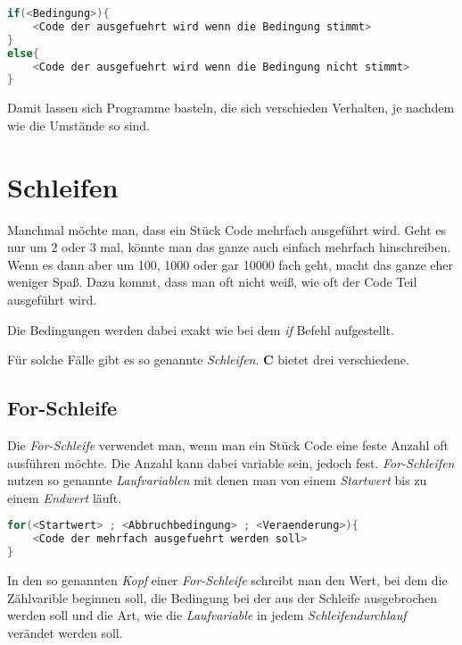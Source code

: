 \documentclass[c_worksheet.tex]{subfiles}
\begin{document}
\begin{lstlisting}[language=c]
if(<Bedingung>){
	<Code der ausgefuehrt wird wenn die Bedingung stimmt>
}
else{
	<Code der ausgefuehrt wird wenn die Bedingung nicht stimmt>
}
\end{lstlisting}

Damit lassen sich Programme basteln, die sich verschieden Verhalten, je nachdem wie die Umstände so sind.





\section{Schleifen} 

Manchmal möchte man, dass ein Stück Code mehrfach ausgeführt wird. Geht es nur um 2 oder 3 mal, könnte man das ganze auch einfach mehrfach hinschreiben. Wenn es dann aber um 100, 1000 oder gar 10000 fach geht, macht das ganze eher weniger Spaß. Dazu kommt, dass man oft nicht weiß, wie oft der Code Teil ausgeführt wird.

Die Bedingungen werden dabei exakt wie bei dem \emph{if} Befehl aufgestellt.

Für solche Fälle gibt es so genannte \emph{Schleifen}. \textbf{C} bietet drei verschiedene.

\subsection{For-Schleife}

Die \emph{For-Schleife} verwendet man, wenn man ein Stück Code eine feste Anzahl oft ausführen möchte. Die Anzahl kann dabei variable sein, jedoch fest. \emph{For-Schleifen} nutzen so genannte \emph{Laufvariablen} mit denen man von einem \emph{Startwert} bis zu einem \emph{Endwert} läuft.

\begin{lstlisting}[language=c]
for(<Startwert> ; <Abbruchbedingung> ; <Veraenderung>){
	<Code der mehrfach ausgefuehrt werden soll>
}
\end{lstlisting}

In den so genannten \emph{Kopf} einer \emph{For-Schleife} schreibt man den Wert, bei dem die Zählvarible beginnen soll, die Bedingung bei der aus der Schleife ausgebrochen werden soll und die Art, wie die \emph{Laufvariable} in jedem \emph{Schleifendurchlauf} verändet werden soll.

 
\end{document}
